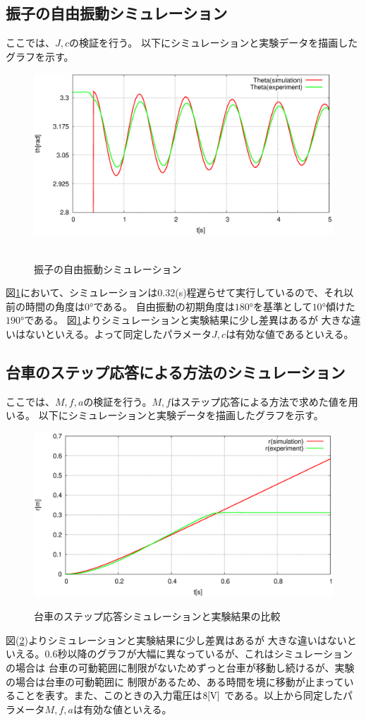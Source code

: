 	\subsection{振子の自由振動シミュレーション}
		ここでは、$J,c$の検証を行う。
		以下にシミュレーションと実験データを描画したグラフを示す。
		\begin{figure}[H]
			\centering
			\includegraphics[width=0.8\linewidth]{gazo/free45Auto.eps}\\　
			\caption{振子の自由振動シミュレーション}
			\label{image:freependulum}
		\end{figure}
		図\ref{image:freependulum}において、シミュレーションは0.32(s)程遅らせて実行しているので、それ以前の時間の角度は$0°$である。
		自由振動の初期角度は$180°$を基準として$10°$傾けた$190°$である。
		図\ref{image:freependulum}よりシミュレーションと実験結果に少し差異はあるが
		大きな違いはないといえる。よって同定したパラメータ$J,c$は有効な値であるといえる。
		\newpage
	\subsection{台車のステップ応答による方法のシミュレーション}
		ここでは、$M,f,a$の検証を行う。$M,f$はステップ応答による方法で求めた値を用いる。
		以下にシミュレーションと実験データを描画したグラフを示す。
		\begin{figure}[H]
			\centering
			\includegraphics[width=0.8\linewidth]{gazo/nabe8.eps}\\
			\caption{台車のステップ応答シミュレーションと実験結果の比較}
			\label{image:step}
		\end{figure}
		図(\ref{image:step})よりシミュレーションと実験結果に少し差異はあるが
		大きな違いはないといえる。0.6秒以降のグラフが大幅に異なっているが、これはシミュレーションの場合は
		台車の可動範囲に制限がないためずっと台車が移動し続けるが、実験の場合は台車の可動範囲に
		制限があるため、ある時間を境に移動が止まっていることを表す。また、このときの入力電圧は$8[\rm{V}]$
		である。以上から同定したパラメータ$M,f,a$は有効な値といえる。
		\newpage
